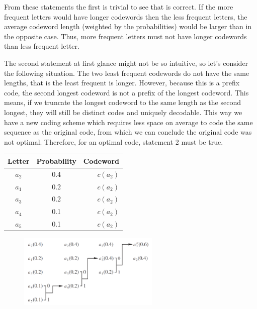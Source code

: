       From these statements the first is trivial to see that is correct. If the more frequent letters would have longer codewords then the less frequent letters, the average codeword length (weighted by the probabilities) would be larger than in the opposite case. Thus, more frequent letters must not have longer codewords than less frequent letter.

      The second statement at first glance might not be so intuitive, so let's consider the following situation. The two least frequent codewords do not have the same lengths, that is the least frequent is longer. However, because this is a prefix code, the second longest codeword is not a prefix of the longest codeword. This means, if we truncate the longest codeword to the same length as the second longest, they will still be distinct codes and uniquely decodable. This way we have a new coding scheme which requires less space on average to code the same sequence as the original code, from which we can conclude the original code was not optimal. Therefore, for an optimal code, statement 2 must be true.

      \begin{table}
        \centering
        \begin{tabular}{ccr}
          \toprule
          Letter & Probability & Codeword \\
          \midrule
          $a_2$ & 0.4 & $c(a_2)$ \\
          $a_1$ & 0.2 & $c(a_2)$ \\
          $a_3$ & 0.2 & $c(a_2)$ \\
          $a_4$ & 0.1 & $c(a_2)$ \\
          $a_5$ & 0.1 & $c(a_2)$ \\
          \bottomrule
        \end{tabular}
        \label{tab:huffman1}
      \end{table}

      \begin{figure}
        \centering
        \includegraphics[width=0.6\textwidth]{huffman}
        \label{fig:huffman}
      \end{figure}


